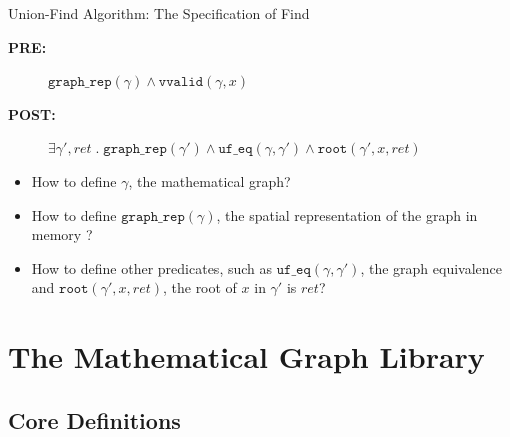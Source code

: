 \documentclass[professionalfonts, xcolor=table]{beamer}
\begin{document}
\begin{frame}{Union-Find Algorithm: The Specification of Find}
  \centering
  \colorbox{lightg}{\parbox{.9\textwidth}{
      \begin{description}
      \item[{\bf PRE:}] $\mathtt{graph\_rep}(\gamma) \wedge \mathtt{vvalid}(\gamma, x)$
      \item[{\bf POST:}] $\exists \gamma', \mathit{ret}\;\text{.}\;\mathtt{graph\_rep}(\gamma')\wedge\mathtt{uf\_eq}(\gamma, \gamma') \wedge \mathtt{root}(\gamma', x, \mathit{ret})$
  \end{description}}}
  \pause
  \vskip10pt
  \colorbox{lightg}{\parbox{.9\textwidth}{
      \begin{itemize}[<+->]
      \item How to define $\gamma$, the mathematical graph?
      \item How to define $\mathtt{graph\_rep}(\gamma)$, the spatial
        representation of the graph in memory ?
      \item How to define other predicates, such as
        $\mathtt{uf\_eq}(\gamma, \gamma')$, the graph equivalence and
        $\mathtt{root}(\gamma', x, \mathit{ret})$, the root of $x$ in $\gamma'$
        is $\mathit{ret}$?
      \end{itemize}
    }}
\end{frame}

\section{The Mathematical Graph Library}
\subsection{Core Definitions}
\end{document}
